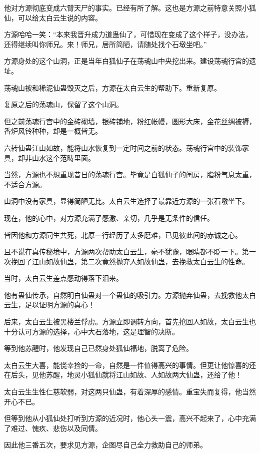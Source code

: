 \begin{this_body}
他对方源彻底变成六臂天尸的事实。已经有所了解。这也是方源之前特意关照小狐仙，可以给太白云生说的内容。

方源哈哈一笑：“本来我晋升成力道蛊仙了，可惜现在变成了这个样子，没办法，还得继续叫你师兄。来！师兄，居所简陋，请随处找个石墩坐吧。”

方源身处的这个山洞，正是当年白狐仙子在荡魂山中央挖出来。建设荡魂行宫的遗址。

荡魂山被和稀泥仙蛊毁灭之后，方源在太白云生的帮助下。重新复原。

复原之后的荡魂山，保留了这个山洞。

但之前荡魂行宫中的金砖砌墙，银砖铺地，粉红帐幔，圆形大床，金花丝绸被褥，香炉风铃种种，却是一概皆无。

六转仙蛊江山如故，能将山水恢复到一定时间之前的状态。荡魂行宫中的装饰家具，却非山水这个范畴里面。

当然，方源也不想重现昔日的荡魂行宫。毕竟是白狐仙子的闺房，脂粉气息太重，不适合方源。

山洞中没有家具，显得简陋无比。太白云生选择了最靠近方源的一张石墩坐下。

现在，他的心中，对方源充满了感激、亲切，几乎是无条件的信任。

皆因他和方源同生共死，北原一行经历了太多磨难，已见彼此间的赤诚之心。

且不说在真传秘境中，方源两次帮助太白云生，毫不犹豫，眼睛都不眨一下。第一次挽回了江山如故仙蛊，第二次竟然抛弃人如故仙蛊，去挽救太白云生的性命。

当时，太白云生差点感动得落下泪来。

他有蛊仙传承，自然明白仙蛊对一个蛊仙的吸引力。方源抛弃仙蛊，去挽救他太白云生，足以证明方源的真心！

后来，太白云生被黑楼兰俘虏。方源立即调转方向，首先抢回人如故，太白云生也十分认可方源的选择，心中大石落地，这是理智的决断。

等到他苏醒时，他发现自己已然身处狐仙福地，脱离了危险。

太白云生大喜，能侥幸捡的一命，自然是一件值得高兴的事情。但更让他惊喜的还在后头，见他苏醒，地灵小狐仙就将江山如故、人如故两大仙蛊，还给了他！

太白云生生性仁慈软弱，对这两只仙蛊，有着深厚的感情。重宝失而复得，他当然开心不已。

但等到他从小狐仙处打听到方源的近况时，他心头一震，高兴不起来了，心中充满了难过、愧疚、悲伤以及同情。

因此他三番五次，要求见方源，企图尽自己全力救助自己的师弟。


\end{this_body}

